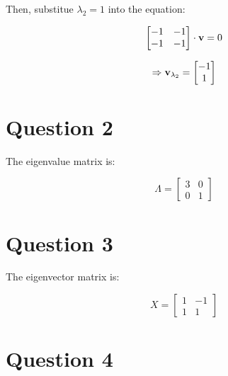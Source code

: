 \documentclass{article}
\begin{document}
Then, substitue $\lambda_2=1$ into the equation:

\[
    \begin{bmatrix}
        -1 & -1\\
        -1 & -1
    \end{bmatrix}
    \cdot \vb{v}=0
\]

\[
\Rightarrow \vb{v}_{\lambda_2}=
    \begin{bmatrix}
        -1\\
        1
    \end{bmatrix}
\]

\section{Question 2}
The eigenvalue matrix is:

\[
    \Lambda=
    \begin{bmatrix}
        3 & 0\\
        0 & 1
    \end{bmatrix}
\]

\section{Question 3}
The eigenvector matrix is:

\[
    X=
    \begin{bmatrix}
        1 & -1\\
        1 & 1
    \end{bmatrix}
\]

\section{Question 4}
\end{document}
